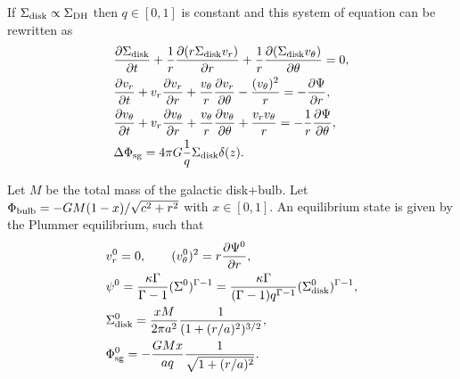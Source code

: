 \documentclass[11pt]{article}
\newcommand{\vr}{v_{r}}
\newcommand{\vt}{v_{\theta}}
\newcommand{\Sigmad}{\Sigma_{\rm{disk}}}
\newcommand{\Phib}{\Phi_{\rm{bulb}}}
\newcommand{\Phisg}{\Phi_{\rm{sg}}}
\begin{document}
If $\Sigma_{\rm{disk}}\propto\Sigma_{\rm{DH}}$ then $q\in [0,1]$ is constant and this system of equation can be rewritten as 
\begin{align}
&\frac{\partial \Sigmad}{\partial t} + \frac{1}{r} \frac{\partial(r\Sigmad \vr)}{\partial r} + \frac{1}{r} \frac{\partial(\Sigmad \vt)}{\partial \theta} = 0 ,\\
&\frac{\partial \vr}{\partial t} + \vr \frac{\partial \vr}{\partial r} + \frac{\vt}{r} \frac{\partial \vr}{\partial \theta} - \frac{(\vt)^2}{r} = -\frac{\partial \Psi}{\partial r} ,\\
&\frac{\partial \vt}{\partial t} + \vr \frac{\partial \vt}{\partial r} + \frac{\vt}{r} \frac{\partial \vt}{\partial \theta} + \frac{\vr\vt}{r} = -\frac{1}{r}\frac{\partial \Psi}{\partial \theta} ,\\
& \Delta \Phisg = 4\pi G \frac{1}{q} \Sigmad \delta (z).
\end{align}

Let $M$ be the total mass of the galactic disk+bulb. Let $\Phib = - G M (1-x)/\sqrt{c^2+r^2}$ with $x\in [0,1]$. An equilibrium state is given by the Plummer equilibrium, such that
\begin{align}
&\vr^0 = 0,\quad \quad (\vt^0)^2 = r \frac{\partial \Psi^0}{\partial r}, \\
& \psi^0 = \frac{\kappa \Gamma}{\Gamma-1} (\Sigma^0)^{\Gamma-1} = \frac{\kappa \Gamma}{(\Gamma-1)q^{\Gamma-1}} (\Sigmad^0)^{\Gamma-1},\\
& \Sigmad^0 = \frac{xM}{2\pi a^2} \frac{1}{(1+(r/a)^2)^{3/2}} ,\\
& \Phisg^0 = -\frac{G M x}{a q} \frac{1}{\sqrt{1+(r/a)^2}} .
\end{align}

\begin{align}
\end{align}
\end{document}

